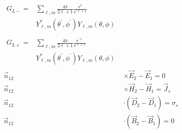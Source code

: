 \documentclass[12pt]{article}
\begin{document}
\begin{multicols}{3}
\begin{align}
  \begin{split}
  G_{L-} = &\textstyle{\sum\limits_{\ell, m}} {}\frac{4\pi}{2\ell + 1} \frac{r^{\ell}}{r^{\prime \ell + 1}}\\
  &Y^{*}_{\ell, m}(\theta^{\prime}, \phi^{\prime})
  Y_{\ell, m}(\theta, \phi)
  \end{split}\\
  \begin{split}
  G_{L+} = &{}\textstyle{\sum\limits_{\ell, m}}
  \frac{4\pi}{2\ell + 1} \frac{r^{\prime \ell}}{r^{\ell + 1}}\\
  &Y^{*}_{\ell, m}(\theta^{\prime}, \phi^{\prime})
  Y_{\ell, m}(\theta, \phi)
  \end{split}\\
  \vec{n}_{12} &\times {\vec{E}_2 - \vec{E}_1} = 0\\
  \vec{n}_{12} &\times {\vec{H}_2 - \vec{H}_1} = \vec{J}_s\\
  \vec{n}_{12} &\cdot (\vec{D}_2 - \vec{D}_1) = \sigma_s\\
  \vec{n}_{12} &\cdot (\vec{B}_2 - \vec{B}_1) = 0
\end{align}


\end{multicols}
\end{document}
